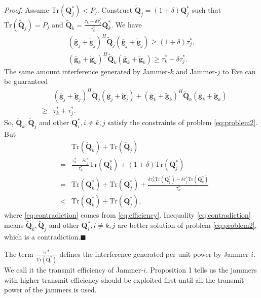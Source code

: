 \documentclass[conference]{IEEEtran}
\begin{document}
\emph{Proof:} Assume $\mathrm{Tr}(\mathbf{Q}_j^*) < P_j$. Construct $\tilde{\mathbf{Q}}_j = (1 + \delta) \mathbf{Q}_j^*$ such that $\mathrm{Tr}(\tilde{\mathbf{Q}}_j) = P_j$ and $\tilde{\mathbf{Q}}_k = \frac{\tau_k - \delta\tau_j^*}{\tau_k^*} \mathbf{Q}_k^*$. We have
\begin{eqnarray}
(\bar{\mathbf{g}}_j+\tilde{\mathbf{g}}_j)^H\tilde{\mathbf{Q}}_j(\bar{\mathbf{g}}_j+\tilde{\mathbf{g}}_j)\geq (1+ \delta)\tau_j^*,\\
(\bar{\mathbf{g}}_k+\tilde{\mathbf{g}}_k)^H\tilde{\mathbf{Q}}_k(\bar{\mathbf{g}}_k+\tilde{\mathbf{g}}_k) \geq \tau_k^* - \delta\tau_j^*.
\end{eqnarray}
The same amount interference generated by Jammer-$k$ and Jammer-$j$ to Eve can be guaranteed
\begin{eqnarray}
&&(\bar{\mathbf{g}}_j+\tilde{\mathbf{g}}_j)^H\tilde{\mathbf{Q}}_j(\bar{\mathbf{g}}_j+\tilde{\mathbf{g}}_j) \nonumber+ (\bar{\mathbf{g}}_k+\tilde{\mathbf{g}}_k)^H\tilde{\mathbf{Q}}_k(\bar{\mathbf{g}}_k+\tilde{\mathbf{g}}_k)\nonumber\\
&\geq&  \tau_k^* + \tau_j^*.
\end{eqnarray}
So, $\tilde{\mathbf{Q}}_k, \tilde{\mathbf{Q}}_j$ and other $\mathbf{Q}_i^*, i \neq k,j$ satisfy the constraints of problem \eqref{eq:problem2}. But
\begin{eqnarray}
&&\mathrm{Tr}(\tilde{\mathbf{Q}}_k) + \mathrm{Tr}(\tilde{\mathbf{Q}}_j)\\
&=&\frac{\tau_k^* - \delta\tau_j^*}{\tau_k^*} \mathrm{Tr}(\mathbf{Q}_k^*)  + (1 + \delta)\mathrm{Tr}(\mathbf{Q}_j^*)\\
&=&\mathrm{Tr}(\mathbf{Q}_k^*) + \mathrm{Tr}(\mathbf{Q}_j^*) + \frac{\delta\tau_k^*\mathrm{Tr}(\mathbf{Q}_j^*)-\delta\tau_j^*\mathrm{Tr}(\mathbf{Q}_k^*)}{\tau_k^*}\\
&<&\mathrm{Tr}(\mathbf{Q}_k^*) + \mathrm{Tr}(\mathbf{Q}_j^*), \label{eq:contradiction}
\end{eqnarray}
where \eqref{eq:contradiction} comes from  \eqref{eq:efficiency}.
Inequality \eqref{eq:contradiction} means $\tilde{\mathbf{Q}}_k, \tilde{\mathbf{Q}}_j$ and other $\mathbf{Q}_i^*, i \neq k,j$ are better solution of problem \eqref{eq:problem2}, which is a contradiction.$\blacksquare$

The term $\frac{\tau_i*}{\mathrm{Tr}(\mathbf{Q}_i^*)}$ defines the interference generated per unit power by Jammer-$i$. We call it the transmit efficiency of Jammer-$i$. Proposition 1 tells us the jammers with higher transmit efficiency should be exploited first until all the transmit power of the jammers is used.
\end{document}
